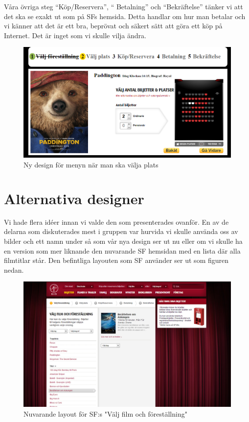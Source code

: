 \documentclass[swedish,a4paper,11pt]{article}
\begin{document}
Våra övriga steg “Köp/Reservera”, “ Betalning” och “Bekräftelse” tänker vi att det ska se exakt ut som på SFs hemsida. Detta handlar om hur man betalar och vi känner att det är ett bra, beprövat och säkert sätt att göra ett köp på Internet. Det är inget som vi skulle vilja ändra.
\begin{figure}[H]
\centering
\includegraphics[scale=0.27]{valdplats.png} 
\caption{Ny design för menyn när man ska välja plats}
\end{figure}



\section{Alternativa designer} 
Vi hade flera idéer innan vi valde den som presenterades ovanför. En av de delarna som diskuterades mest i gruppen var hurvida vi skulle använda oss av bilder och ett namn under så som vår nya design ser ut nu eller om vi skulle ha en version som mer liknande den nuvarande SF hemsidan med en lista där alla filmtitlar står. Den befintliga layouten som SF använder ser ut som figuren nedan. 

\begin{figure}[H]
\centering
\includegraphics[scale=0.27]{LISTVY.png} 
\caption{Nuvarande layout för SF:s "Välj film och föreställning"}
\end{figure}
\end{document}
